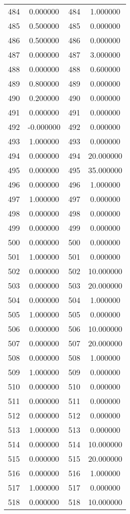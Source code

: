 \documentclass[12pt]{article}
\begin{document}
\begin{longtable}{@{}cccc@{}}
484 & 0.000000 & 484 & 1.000000 \\
485 & 0.500000 & 485 & 0.000000 \\
486 & 0.500000 & 486 & 0.000000 \\
487 & 0.000000 & 487 & 3.000000 \\
488 & 0.000000 & 488 & 0.600000 \\
489 & 0.800000 & 489 & 0.000000 \\
490 & 0.200000 & 490 & 0.000000 \\
491 & 0.000000 & 491 & 0.000000 \\
492 & -0.000000 & 492 & 0.000000 \\
493 & 1.000000 & 493 & 0.000000 \\
494 & 0.000000 & 494 & 20.000000 \\
495 & 0.000000 & 495 & 35.000000 \\
496 & 0.000000 & 496 & 1.000000 \\
497 & 1.000000 & 497 & 0.000000 \\
498 & 0.000000 & 498 & 0.000000 \\
499 & 0.000000 & 499 & 0.000000 \\
500 & 0.000000 & 500 & 0.000000 \\
501 & 1.000000 & 501 & 0.000000 \\
502 & 0.000000 & 502 & 10.000000 \\
503 & 0.000000 & 503 & 20.000000 \\
504 & 0.000000 & 504 & 1.000000 \\
505 & 1.000000 & 505 & 0.000000 \\
506 & 0.000000 & 506 & 10.000000 \\
507 & 0.000000 & 507 & 20.000000 \\
508 & 0.000000 & 508 & 1.000000 \\
509 & 1.000000 & 509 & 0.000000 \\
510 & 0.000000 & 510 & 0.000000 \\
511 & 0.000000 & 511 & 0.000000 \\
512 & 0.000000 & 512 & 0.000000 \\
513 & 1.000000 & 513 & 0.000000 \\
514 & 0.000000 & 514 & 10.000000 \\
515 & 0.000000 & 515 & 20.000000 \\
516 & 0.000000 & 516 & 1.000000 \\
517 & 1.000000 & 517 & 0.000000 \\
518 & 0.000000 & 518 & 10.000000 \\

\end{longtable}
\end{document}
